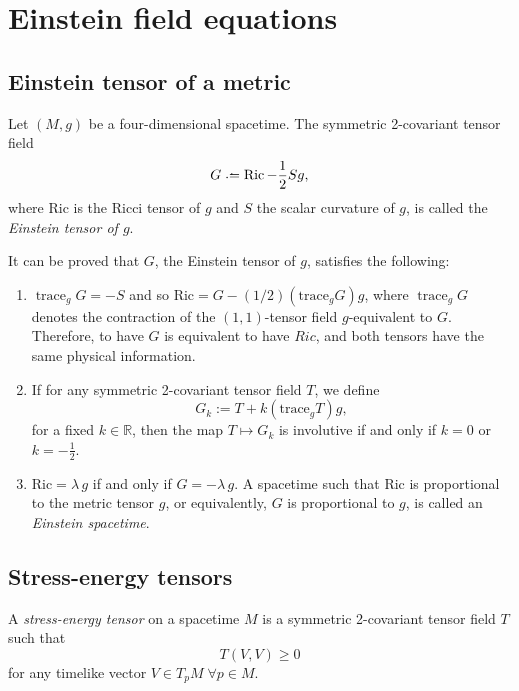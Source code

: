 \chapter{Einstein field equations}

\section{Einstein tensor of a metric}

\begin{definition}
	Let $(M,g)$ be a four-dimensional spacetime. The symmetric 2-covariant tensor field
	\[
		G \defeq \operatorname{Ric}-\frac{1}{2}Sg,
	\]
	where Ric is the Ricci tensor of $g$ and $S$ the scalar curvature of $g$, is called the \emph{Einstein tensor of $g$}.
\end{definition}

It can be proved that $G$, the Einstein tensor of $g$, satisfies the following:

\begin{enumerate}
	\item $\operatorname{trace}_gG=-S$ and so $\mathrm{Ric}=G-(1/2)(\mathrm{trace}_gG)g$, where $\operatorname{trace}_gG$ denotes the contraction of the $(1,1)$-tensor field $g$-equivalent to $G$. Therefore, to have $G$ is equivalent to have $Ric$, and both tensors have the same physical information.
	\item If for any symmetric 2-covariant tensor field $T$, we define \[G_k:=T+k(\mathrm{trace}_gT)g,\] for a fixed $k\in \mathbb{R}$, then the map $T \longmapsto G_k$ is involutive if and only if $k=0$ or $k=-\frac{1}{2}$.
	\item $\mathrm{Ric}=\lambda\,g$ if and only if $G=-\lambda\,g$. A spacetime such that Ric is proportional to the metric tensor $g$, or equivalently, $G$ is proportional to $g$, is called an \emph{Einstein spacetime}.
\end{enumerate}

\section{Stress-energy tensors}

\begin{definition}
	A \emph{stress-energy tensor} on a spacetime $M$ is a symmetric 2-covariant tensor field $T$ such that
	\begin{equation}
	\label{eq:stress}
		T(V,V) \geq 0
	\end{equation}
	for any timelike vector $V \in T_p M \; \forall p \in M$.
\end{definition}

